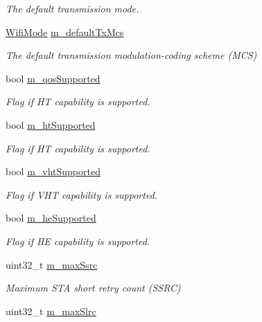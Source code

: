\begin{DoxyCompactItemize}
\begin{DoxyCompactList}\small\item\em The default transmission mode. \end{DoxyCompactList}\item 
\hyperlink{classns3_1_1WifiMode}{Wifi\+Mode} \hyperlink{classns3_1_1WifiRemoteStationManager_a19da425b2dc81ff24151159dc9679aec}{m\+\_\+default\+Tx\+Mcs}
\begin{DoxyCompactList}\small\item\em The default transmission modulation-\/coding scheme (M\+CS) \end{DoxyCompactList}\item 
bool \hyperlink{classns3_1_1WifiRemoteStationManager_a508ff7784fe61e700fd4aad79ca9a187}{m\+\_\+qos\+Supported}
\begin{DoxyCompactList}\small\item\em Flag if HT capability is supported. \end{DoxyCompactList}\item 
bool \hyperlink{classns3_1_1WifiRemoteStationManager_ac8912f2980dca1e969c88f2d4583ed2b}{m\+\_\+ht\+Supported}
\begin{DoxyCompactList}\small\item\em Flag if HT capability is supported. \end{DoxyCompactList}\item 
bool \hyperlink{classns3_1_1WifiRemoteStationManager_aca8ce44bedaee4dbe872057904ff678b}{m\+\_\+vht\+Supported}
\begin{DoxyCompactList}\small\item\em Flag if V\+HT capability is supported. \end{DoxyCompactList}\item 
bool \hyperlink{classns3_1_1WifiRemoteStationManager_a7ea87a71bac75104db7ec4c0a0c94acc}{m\+\_\+he\+Supported}
\begin{DoxyCompactList}\small\item\em Flag if HE capability is supported. \end{DoxyCompactList}\item 
uint32\+\_\+t \hyperlink{classns3_1_1WifiRemoteStationManager_a25cf937b8babffbe071a8d5ef5ae9f7b}{m\+\_\+max\+Ssrc}
\begin{DoxyCompactList}\small\item\em Maximum S\+TA short retry count (S\+S\+RC) \end{DoxyCompactList}\item 
uint32\+\_\+t \hyperlink{classns3_1_1WifiRemoteStationManager_ac32ca2716dfdae73e1399ef0845c50eb}{m\+\_\+max\+Slrc}

\end{DoxyCompactItemize}
